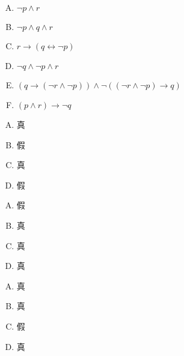 {{        %
        \begin{practices}
            \begin{enumerate}[A.]
                \item $\neg p \wedge r$
                \item $\neg p \wedge q \wedge r$
                \item $r \rightarrow (q \leftrightarrow \neg p)$
                \item $\neg q \wedge \neg p \wedge r$
                \item $(q \rightarrow (\neg r \wedge \neg p)) \wedge \neg ((\neg r \wedge \neg p) \rightarrow q)$
                \item $(p \wedge r) \rightarrow \neg q$
            \end{enumerate}
        \end{practices}

        \begin{practices}
            \begin{enumerate}[A.]
                \item 真
                \item 假
                \item 真
                \item 假
            \end{enumerate}
        \end{practices}

        \begin{practices}
            \begin{enumerate}[A.]
                \item 假
                \item 真
                \item 真
                \item 真
            \end{enumerate}
        \end{practices}

        \begin{practices}
            \begin{enumerate}[A.]
                \item 真
                \item 真
                \item 假
                \item 真
            \end{enumerate}
        \end{practices}

}}
